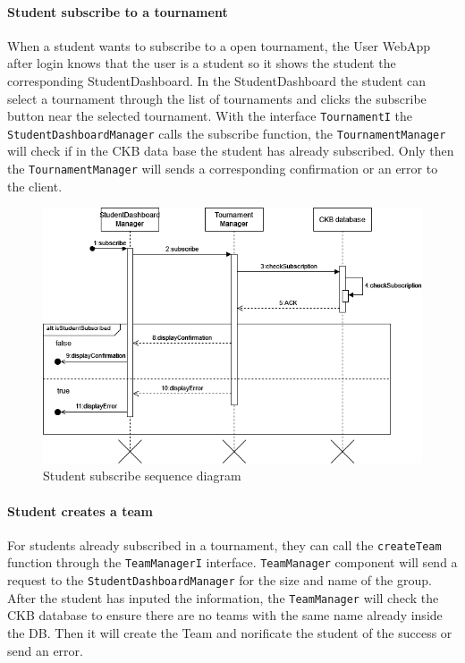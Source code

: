\paragraph{Student subscribe to a tournament}
When a student wants to subscribe to a open tournament, the User WebApp after login knows that the user is a student so it shows the student the corresponding StudentDashboard.
In the StudentDashboard the student can select a tournament through the list of tournaments and clicks the subscribe button near the selected tournament.
With the interface \verb|TournamentI| the \verb|StudentDashboardManager| calls the subscribe function, the \verb|TournamentManager| will check if in the CKB data base the student has already subscribed.
Only then the \verb|TournamentManager| will sends a corresponding confirmation or an error to the client.

\begin{figure}[H]
    \begin{center}
        \includegraphics[width=\linewidth]{Images/sequence/Sd_subscription.png}
        \caption{Student subscribe sequence diagram}
        \label{fig:student_subscribe}
    \end{center}
\end{figure}


\paragraph{Student creates a team}
For students already subscribed in a tournament, they can call the \verb|createTeam| function through the \verb|TeamManagerI| interface.
\verb|TeamManager| component will send a request to the \verb|StudentDashboardManager| for the size and name of the group. After the student has inputed the information, the \verb|TeamManager|
will check the CKB database to ensure there are no teams with the same name already inside the DB. Then it will create the Team and norificate the student of the success or send an error.


